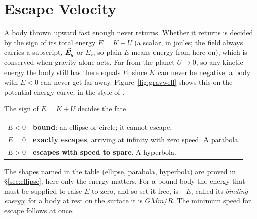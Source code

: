 \section{Escape Velocity}\label{sec:escape}

A body thrown upward fast enough never returns. Whether it returns is decided by the sign of its total
energy $E=K+U$ (a scalar, in joules; the field always carries a subscript, $\vec{\bm{E}}_g$ or $E_r$, so plain
$E$ means energy from here on), which is conserved when gravity alone acts. Far from the planet $U\to0$, so any kinetic
energy the body still has there equals $E$; since $K$ can never be negative, a body with $E<0$ can never
get far away. Figure~\ref{fig:gravwell} shows this on the potential-energy curve, in the style of
.

\begin{keybox}{The sign of $E=K+U$ decides the fate}
\centering
\begin{tabular}{@{}cl@{}}
\toprule
$E<0$ & \textbf{bound}: an ellipse or circle; it cannot escape.\\
$E=0$ & \textbf{exactly escapes}, arriving at infinity with zero speed. A parabola.\\
$E>0$ & \textbf{escapes with speed to spare}. A hyperbola.\\
\bottomrule
\end{tabular}
\end{keybox}

\begin{figure}[htbp]
\centering
{}
\end{figure}

The shapes named in the table (ellipse, parabola, hyperbola) are proved in \S\ref{sec:ellipse}; here only
the energy matters. For a bound body the energy that must be supplied to raise $E$ to zero, and so set it
free, is $-E$, called its \emph{binding energy}; for a body at rest on the surface it is $GMm/R$. The
minimum speed for escape follows at once.

